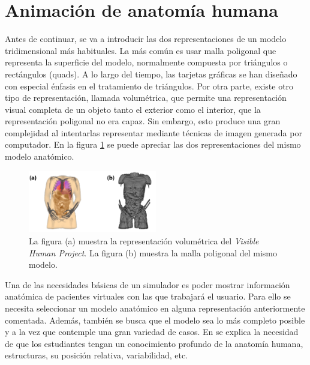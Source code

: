 \section{Animación de anatomía humana} 
\label{anatomy}


Antes de continuar, se va a introducir las dos representaciones de un modelo tridimensional más habituales. 
La más común es usar malla poligonal que representa la superficie del modelo, normalmente compuesta por triángulos o rectángulos (quads). %
A lo largo del tiempo, las tarjetas gráficas se han diseñado con especial énfasis en el tratamiento de triángulos.
Por otra parte, existe otro tipo de representación, llamada volumétrica, que permite una representación visual completa de un objeto tanto el exterior como el interior, que la representación poligonal no era capaz. Sin embargo, esto produce una gran complejidad al intentarlas representar mediante técnicas de imagen generada por computador.
En la figura \ref{fig:HVP} se puede apreciar las dos representaciones del mismo modelo anatómico.

\begin{figure}[h]
   \centering
    \includegraphics[width=0.5\textwidth]{IMG/volvsb-rep.png}
    \caption{La figura (a) muestra la representación volumétrica del \emph{Visible Human Project}\cite{ackerman1998visible}. La figura (b) muestra la malla poligonal del mismo modelo. }
   \label{fig:HVP}
\end{figure}

Una de las necesidades básicas de un simulador es poder mostrar información anatómica de pacientes virtuales con las que trabajará el usuario. Para ello se necesita seleccionar un modelo anatómico en alguna representación anteriormente comentada. Además, también se busca que el modelo sea lo más completo posible y a la vez que contemple una gran variedad de casos. En  \cite{preim2018survey} se explica la necesidad de que los estudiantes tengan un conocimiento profundo de la anatomía humana, estructuras, su posición relativa, variabilidad, etc. 

